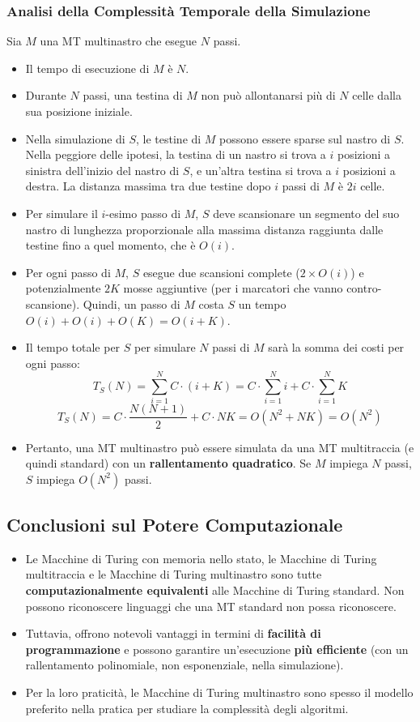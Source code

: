 \documentclass[a4paper, 11pt]{book} %
\theoremstyle{definition}
\begin{document}
\subsubsection{Analisi della Complessità Temporale della Simulazione}
Sia $M$ una MT multinastro che esegue $N$ passi.
\begin{itemize}
    \item Il tempo di esecuzione di $M$ è $N$.
    \item Durante $N$ passi, una testina di $M$ non può allontanarsi più di $N$ celle dalla sua posizione iniziale.
    \item Nella simulazione di $S$, le testine di $M$ possono essere sparse sul nastro di $S$. Nella peggiore delle ipotesi, la testina di un nastro si trova a $i$ posizioni a sinistra dell'inizio del nastro di $S$, e un'altra testina si trova a $i$ posizioni a destra. La distanza massima tra due testine dopo $i$ passi di $M$ è $2i$ celle.
    \item Per simulare il $i$-esimo passo di $M$, $S$ deve scansionare un segmento del suo nastro di lunghezza proporzionale alla massima distanza raggiunta dalle testine fino a quel momento, che è $O(i)$.
    \item Per ogni passo di $M$, $S$ esegue due scansioni complete ($2 \times O(i)$) e potenzialmente $2K$ mosse aggiuntive (per i marcatori che vanno contro-scansione). Quindi, un passo di $M$ costa $S$ un tempo $O(i) + O(i) + O(K) = O(i+K)$.
    \item Il tempo totale per $S$ per simulare $N$ passi di $M$ sarà la somma dei costi per ogni passo:
    \[
    T_S(N) = \sum_{i=1}^{N} C \cdot (i + K) = C \cdot \sum_{i=1}^{N} i + C \cdot \sum_{i=1}^{N} K
    \]
    \[
    T_S(N) = C \cdot \frac{N(N+1)}{2} + C \cdot NK = O(N^2 + NK) = O(N^2)
    \]
    \item Pertanto, una MT multinastro può essere simulata da una MT multitraccia (e quindi standard) con un \textbf{rallentamento quadratico}. Se $M$ impiega $N$ passi, $S$ impiega $O(N^2)$ passi.
\end{itemize}

\subsection{Conclusioni sul Potere Computazionale}
\begin{itemize}
    \item Le Macchine di Turing con memoria nello stato, le Macchine di Turing multitraccia e le Macchine di Turing multinastro sono tutte \textbf{computazionalmente equivalenti} alle Macchine di Turing standard. Non possono riconoscere linguaggi che una MT standard non possa riconoscere.
    \item Tuttavia, offrono notevoli vantaggi in termini di \textbf{facilità di programmazione} e possono garantire un'esecuzione \textbf{più efficiente} (con un rallentamento polinomiale, non esponenziale, nella simulazione).
    \item Per la loro praticità, le Macchine di Turing multinastro sono spesso il modello preferito nella pratica per studiare la complessità degli algoritmi.
\end{itemize}
\end{document}
